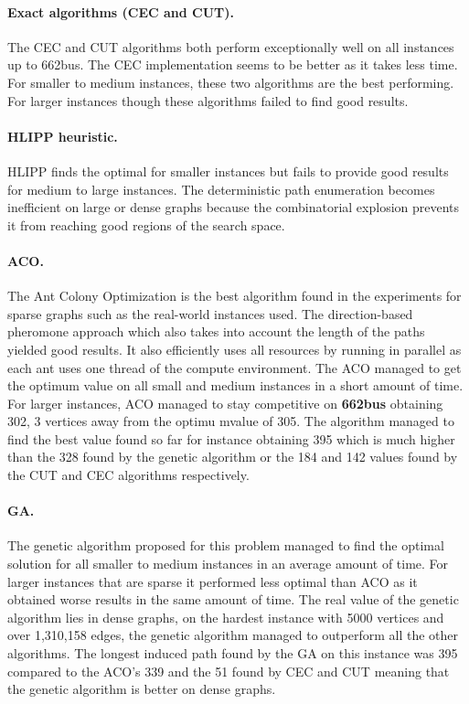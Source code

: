 \paragraph{Exact algorithms (CEC and CUT).} The CEC and CUT algorithms both perform exceptionally well on all instances up to 662bus. The CEC implementation seems to be better as it takes less time. For smaller to medium instances, these two algorithms are the best performing. For larger instances though these algorithms failed to find good results.

\paragraph{HLIPP heuristic.} HLIPP finds the optimal for smaller instances but fails to provide good results for medium to large instances. The deterministic path enumeration becomes inefficient on large or dense graphs because the combinatorial explosion prevents it from reaching good regions of the search space.

\paragraph{ACO.} The Ant Colony Optimization is the best algorithm found in the experiments for sparse graphs such as the real-world instances used. The direction-based pheromone approach which also takes into account the length of the paths yielded good results. It also efficiently uses all resources by running in parallel as each ant uses one thread of the compute environment. The ACO managed to get the optimum value on all small and medium instances in a short amount of time. For larger instances, ACO managed to stay competitive on \textbf{662bus} obtaining 302, 3 vertices away from the optimu mvalue of 305. The algorithm managed to find the best value found so far for  instance obtaining 395 which is much higher than the 328 found by the genetic algorithm or the 184 and 142 values found by the CUT and CEC algorithms respectively.

\paragraph{GA.} The genetic algorithm proposed for this problem managed to find the optimal solution for all smaller to medium instances in an average amount of time. For larger instances that are sparse it performed less optimal than ACO as it obtained worse results in the same amount of time. The real value of the genetic algorithm lies in dense graphs, on the hardest instance with 5000 vertices and over 1,310,158 edges, the genetic algorithm managed to outperform all the other algorithms. The longest induced path found by the GA on this instance was 395 compared to the ACO's 339 and the 51 found by CEC and CUT meaning that the genetic algorithm is better on dense graphs.
